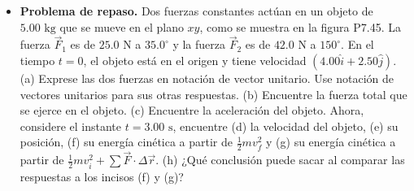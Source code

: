 \documentclass[11pt,a4paper]{article}
\begin{document}
\begin{itemize}
    \item[\textbf{45.}] \textbf{Problema de repaso.} Dos fuerzas constantes actúan en un objeto de $5.00 \text{ kg}$ que se mueve en el plano $xy$, como se muestra en la figura P7.45. La fuerza $\vec{F}_1$ es de $25.0 \text{ N}$ a $35.0^\circ$ y la fuerza $\vec{F}_2$ es de $42.0 \text{ N}$ a $150^\circ$. En el tiempo $t = 0$, el objeto está en el origen y tiene velocidad $(4.00\hat{i} + 2.50\hat{j})$. (a) Exprese las dos fuerzas en notación de vector unitario. Use notación de vectores unitarios para sus otras respuestas. (b) Encuentre la fuerza total que se ejerce en el objeto. (c) Encuentre la aceleración del objeto. Ahora, considere el instante $t = 3.00 \text{ s}$, encuentre (d) la velocidad del objeto, (e) su posición, (f) su energía cinética a partir de $\frac{1}{2}mv_f^2$ y (g) su energía cinética a partir de $\frac{1}{2}mv_i^2 + \sum \vec{F} \cdot \Delta\vec{r}$. (h) ¿Qué conclusión puede sacar al comparar las respuestas a los incisos (f) y (g)?
    \vspace*{8cm}
\end{itemize}

\newpage
\end{document}
